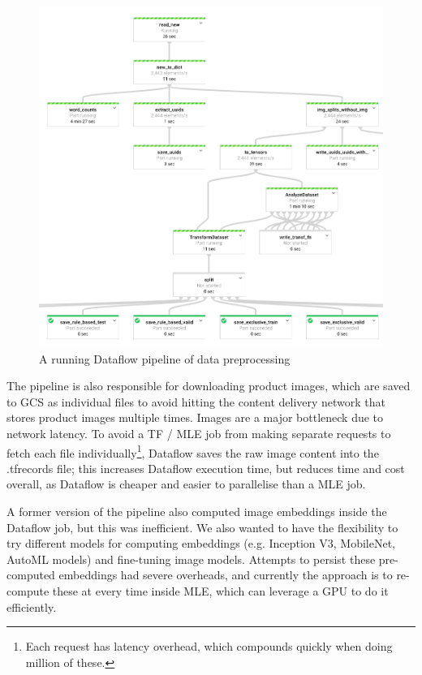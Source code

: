 \begin{figure}
  \includegraphics[width=\linewidth]{figures/df}
  \caption{A running Dataflow pipeline of data preprocessing}
  \label{df}
\end{figure}

The pipeline is also responsible for downloading product images, which are saved to GCS as individual files to avoid hitting the content delivery network that stores product images multiple times.
Images are a major bottleneck due to network latency.
To avoid a TF / MLE job from making separate requests to fetch each file individually\footnote{Each request has latency overhead, which compounds quickly when doing million of these.}, Dataflow saves the raw image content into the .tfrecords file; this increases Dataflow execution time, but reduces time and cost overall, as Dataflow is cheaper and easier to parallelise than a MLE job.

A former version of the pipeline also computed image embeddings inside the Dataflow job, but this was inefficient.
We also wanted to have the flexibility to try different models for computing embeddings (e.g. Inception V3, MobileNet, AutoML models) and fine-tuning image models.
Attempts to persist these pre-computed embeddings had severe overheads, and currently the approach is to re-compute these at every time inside MLE, which can leverage a GPU to do it efficiently.

